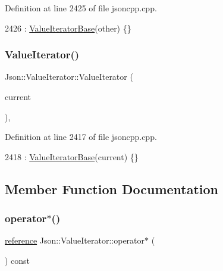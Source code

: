 Definition at line 2425 of file jsoncpp.\+cpp.


\begin{DoxyCode}
2426     : \hyperlink{class_json_1_1_value_iterator_base_af45b028d9ff9cbd2554a87878b42dd75}{ValueIteratorBase}(other) \{\}
\end{DoxyCode}
\mbox{\label{class_json_1_1_value_iterator_afb06ea21add440c78c27dc49570460a5}} 
\subsubsection{\texorpdfstring{Value\+Iterator()}{ValueIterator()}\hspace{0.1cm}{\footnotesize\ttfamily [4/4]}}
{\footnotesize\ttfamily Json\+::\+Value\+Iterator\+::\+Value\+Iterator (\begin{DoxyParamCaption}\item[{const Value\+::\+Object\+Values\+::iterator \&}]{current }\end{DoxyParamCaption})\hspace{0.3cm}{\ttfamily [explicit]}, {\ttfamily [private]}}



Definition at line 2417 of file jsoncpp.\+cpp.


\begin{DoxyCode}
2418     : \hyperlink{class_json_1_1_value_iterator_base_af45b028d9ff9cbd2554a87878b42dd75}{ValueIteratorBase}(current) \{\}
\end{DoxyCode}


\subsection{Member Function Documentation}
\mbox{\label{class_json_1_1_value_iterator_a3be48b0c1729ec2532f1ff27ad465d32}} 
\subsubsection{\texorpdfstring{operator$\ast$()}{operator*()}}
{\footnotesize\ttfamily \hyperlink{class_json_1_1_value_iterator_ae87929b4567aa00372cf602c43b57160}{reference} Json\+::\+Value\+Iterator\+::operator$\ast$ (\begin{DoxyParamCaption}{ }\end{DoxyParamCaption}) const\hspace{0.3cm}{\ttfamily [inline]}}



